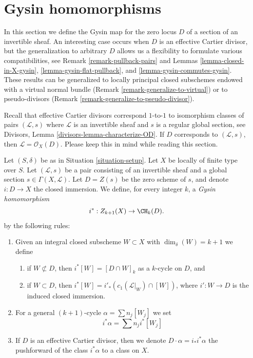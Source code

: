 \section{Gysin homomorphisms}
\label{section-intersecting-effective-Cartier}

\noindent
In this section we define the Gysin map for the zero locus $D$ of a
section of an invertible sheaf. An interesting case occurs when $D$
is an effective Cartier divisor, but the generalization to arbitrary $D$
allows us a flexibility to formulate various compatibilities, see
Remark \ref{remark-pullback-pairs} and
Lemmas \ref{lemma-closed-in-X-gysin}, \ref{lemma-gysin-flat-pullback}, and
\ref{lemma-gysin-commutes-gysin}.
These results can be generalized to locally principal closed subschemes
endowed with a virtual normal bundle
(Remark \ref{remark-generalize-to-virtual}) or to
pseudo-divisors (Remark \ref{remark-generalize-to-pseudo-divisor}).

\medskip\noindent
Recall that effective Cartier divisors correspond $1$-to-$1$ to
isomorphism classes of pairs $(\mathcal{L}, s)$ where $\mathcal{L}$
is an invertible sheaf and $s$ is a regular global section, see
Divisors, Lemma \ref{divisors-lemma-characterize-OD}.
If $D$ corresponds to $(\mathcal{L}, s)$, then
$\mathcal{L} = \mathcal{O}_X(D)$. Please keep this in mind while
reading this section.

\begin{definition}
\label{definition-gysin-homomorphism}
Let $(S, \delta)$ be as in Situation \ref{situation-setup}.
Let $X$ be locally of finite type over $S$.
Let $(\mathcal{L}, s)$ be a pair consisting of an invertible
sheaf and a global section $s \in \Gamma(X, \mathcal{L})$.
Let $D = Z(s)$ be the zero scheme of $s$, and
denote $i : D \to X$ the closed immersion.
We define, for every integer $k$, a {\it Gysin homomorphism}
$$
i^* : Z_{k + 1}(X) \to \CH_k(D).
$$
by the following rules:
\begin{enumerate}
\item Given an integral closed subscheme $W \subset X$ with
$\dim_\delta(W) = k + 1$ we define
\begin{enumerate}
\item if $W \not \subset D$, then $i^*[W] = [D \cap W]_k$ as a
$k$-cycle on $D$, and
\item if $W \subset D$, then
$i^*[W] = i'_*(c_1(\mathcal{L}|_W) \cap [W])$,
where $i' : W \to D$ is the induced closed immersion.
\end{enumerate}
\item For a general $(k + 1)$-cycle $\alpha = \sum n_j[W_j]$
we set
$$
i^*\alpha = \sum n_j i^*[W_j]
$$
\item If $D$ is an effective Cartier divisor, then we denote
$D \cdot \alpha = i_*i^*\alpha$ the pushforward of the class $i^*\alpha$
to a class on $X$.
\end{enumerate}
\end{definition}

